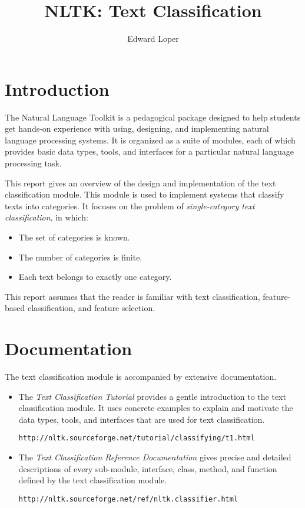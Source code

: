 \documentclass[12pt]{article}
\title{NLTK: Text Classification}
\author{Edward Loper}
\begin{document}
\maketitle

\section{Introduction}

  The Natural Language Toolkit is a pedagogical package designed to
  help students get hands-on experience with using, designing, and
  implementing natural language processing systems.  It is organized
  as a suite of modules, each of which provides basic data types,
  tools, and interfaces for a particular natural language processing
  task.

  This report gives an overview of the design and implementation of
  the text classification module.  This module is used to implement
  systems that classify texts into categories.  It focuses on the
  problem of \emph{single-category text classification}, in which:

  \begin{itemize}
    \item The set of categories is known.
    \item The number of categories is finite.
    \item Each text belongs to exactly one category.
  \end{itemize}

  This report assumes that the reader is familiar with text
  classification, feature-based classification, and feature selection.

\section{Documentation}

  The text classification module is accompanied by extensive
  documentation.  

  \begin{itemize}

    \item The \emph{Text Classification Tutorial} provides a gentle
    introduction to the text classification module.  It uses concrete
    examples to explain and motivate the data types, tools, and
    interfaces that are used for text classification. 

    \texttt{http://nltk.sourceforge.net/tutorial/classifying/t1.html}

    \item The \emph{Text Classification Reference Documentation} gives
    precise and detailed descriptions of every sub-module, interface,
    class, method, and function defined by the text classification
    module.

    \texttt{http://nltk.sourceforge.net/ref/nltk.classifier.html}

  \end{itemize}
\end{document}
